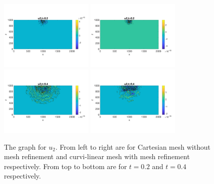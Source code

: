 \begin{figure}[htbp]
	\centering
	\includegraphics[width=0.4\textwidth,trim={0 2.8cm 0 2.8cm}, clip]{u2_t02_cartesian.png}
	\includegraphics[width=0.4\textwidth,trim={0 2.8cm 0 2.8cm}, clip]{u2_t02_curvi_mr.png}\\
	\includegraphics[width=0.4\textwidth,trim={0 2.8cm 0 2.8cm}, clip]{u2_t04_cartesian.png}
	\includegraphics[width=0.4\textwidth,trim={0 2.8cm 0 2.8cm}, clip]{u2_t04_curvi_mr.png}
	\caption{The graph for $u_2$. From left to right are for Cartesian mesh without mesh refinement and curvi-linear mesh with mesh refinement respectively. From top to bottom are for $t = 0.2$ and $t = 0.4$ respectively.}\label{u2}
\end{figure}

